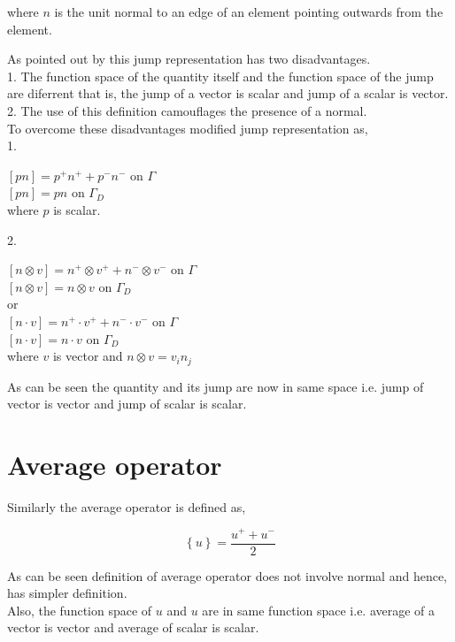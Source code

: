 \documentclass[a4paper,12pt]{book}
\begin{document}
where $n$ is the unit normal to an edge of an element pointing outwards from the element.

As pointed out by \cite{Montlaur2} this jump representation has two disadvantages.\\

1. The function space of the quantity itself and the function space of the jump are diferrent that is, the jump of a vector is scalar and jump of a scalar is vector.\\
2. The use of this definition camouflages the presence of a normal.\\

To overcome these disadvantages \cite{Montlaur2} modified jump representation as,\\

1.  
\begin{center}
$[pn] = p^+ n^+ + p^- n^- $ on $\Gamma$\\
$[pn] = p n $ on $\Gamma_D$\\
where $p$ is scalar.
\end{center}

2. \\
\begin{center}
$[n \otimes v] = n^+ \otimes v^+ + n^- \otimes v^-$ on $\Gamma$\\
$[n \otimes v] = n \otimes v$ on $\Gamma_D$\\
 or \\
$[n \cdot v] = n^+ \cdot v^+ + n^- \cdot v^-$ on $\Gamma$\\
$[n \cdot v] = n \cdot v$ on $\Gamma_D$\\
where $v$ is vector and $n \otimes v = v_i n_j$\\ 
\end{center}

As can be seen the quantity and its jump are now in same space i.e. jump of vector is vector and jump of scalar is scalar.

\section{Average operator}

Similarly the average operator is defined as,

\begin{equation}\label{average operator}
\left\lbrace u \right\rbrace = \frac{u^+ + u^-}{2}  
\end{equation} 


As can be seen definition of average operator does not involve normal and hence, has simpler definition.\\
Also, the function space of $u$ and ${u}$ are in same function space i.e. average of a vector is vector and average of scalar is scalar.\\
\end{document}
